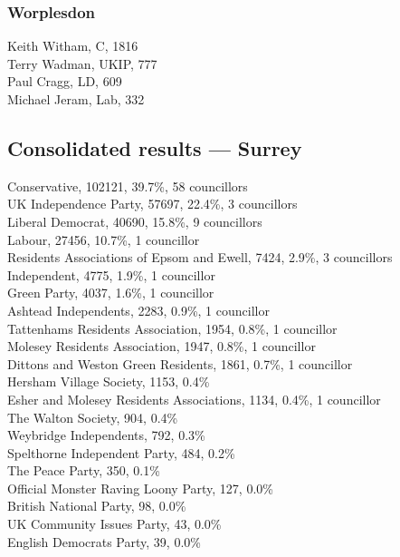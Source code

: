 \documentclass[a4paper,openany,10pt]{book}
\begin{document}
\subsubsection*{Worplesdon}



Keith Witham, C, 1816\\
Terry Wadman, UKIP, 777\\
Paul Cragg, LD, 609\\
Michael Jeram, Lab, 332\\




\subsection*{Consolidated results --- Surrey}
Conservative, 102121, 39.7\%, 58 councillors\\
UK Independence Party, 57697, 22.4\%, 3 councillors\\
Liberal Democrat, 40690, 15.8\%, 9 councillors\\
Labour, 27456, 10.7\%, 1 councillor\\
Residents Associations of Epsom and Ewell, 7424, 2.9\%, 3 councillors\\
Independent, 4775, 1.9\%, 1 councillor\\
Green Party, 4037, 1.6\%, 1 councillor\\
Ashtead Independents, 2283, 0.9\%, 1 councillor\\
Tattenhams Residents Association, 1954, 0.8\%, 1 councillor\\
Molesey Residents Association, 1947, 0.8\%, 1 councillor\\
Dittons and Weston Green Residents, 1861, 0.7\%, 1 councillor\\
Hersham Village Society, 1153, 0.4\% \\
Esher and Molesey Residents Associations, 1134, 0.4\%, 1 councillor\\
The Walton Society, 904, 0.4\% \\
Weybridge Independents, 792, 0.3\% \\
Spelthorne Independent Party, 484, 0.2\% \\
The Peace Party, 350, 0.1\% \\
Official Monster Raving Loony Party, 127, 0.0\% \\
British National Party, 98, 0.0\% \\
UK Community Issues Party, 43, 0.0\% \\
English Democrats Party, 39, 0.0\% \\
\end{document}
